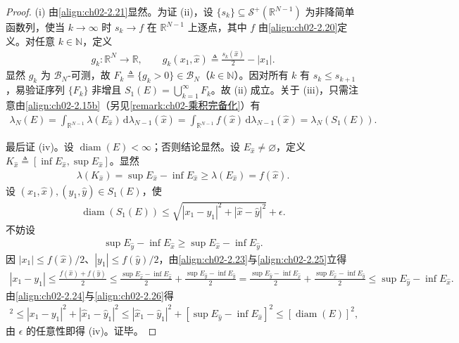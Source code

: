 \documentclass[../../main.tex]{subfiles}%
\begin{document}
\begin{proof}
(i) 由\eqref{align:ch02-2.21}显然。为证 (ii)，设 $\{s_k\}\subseteq\mathscr S^+(\mathbb R^{N-1})$ 为非降简单函数列，使当 $k\to\infty$ 时 $s_k\to f$ 在 $\mathbb R^{N-1}$ 上逐点，其中 $f$ 由\eqref{align:ch02-2.20}定义。对任意 $k\in\mathbb N$，定义
\begin{align*}
g_k:\mathbb R^N\to\mathbb R,\qquad g_k(x_1,\hat x)\triangleq \frac{s_k(\hat x)}2-|x_1|.
\end{align*}
显然 $g_k$ 为 $\mathscr B_N$-可测，故 $F_k\triangleq \{g_k>0\}\in\mathscr B_N$（$k\in\mathbb N$）。因对所有 $k$ 有 $s_k\leqslant s_{k+1}$，易验证序列 $\{F_k\}$ 非增且 $S_1(E)=\bigcup_{k=1}^\infty F_k$。故 (ii) 成立。关于 (iii)，只需注意由\eqref{align:ch02-2.15b}（另见\cref{remark:ch02-乘积完备化}）有
\begin{align*}
\lambda_N(E)=\int_{\mathbb R^{N-1}}\lambda(E_{\hat x})\,\mathrm{d}\lambda_{N-1}(\hat x)
=\int_{\mathbb R^{N-1}}f(\hat x)\,\mathrm{d}\lambda_{N-1}(\hat x)=\lambda_N(S_1(E)).
\end{align*}

最后证 (iv)。设 $\operatorname{diam}(E)<\infty$；否则结论显然。设 $E_{\hat x}\neq\varnothing $，定义 $K_{\hat x}\triangleq [\inf E_{\hat x},\sup E_{\hat x}]$。显然
\begin{align}
\lambda(K_{\hat x})=\sup E_{\hat x}-\inf E_{\hat x}\geqslant\lambda(E_{\hat x})=f(\hat x). \label{align:ch02-2.23}
\end{align}
设 $(x_1,\hat x),(y_1,\hat y)\in S_1(E)$，使
\begin{align}
\operatorname{diam}(S_1(E))\leqslant\sqrt{|x_1-y_1|^2+|\hat x-\hat y|^2}+\epsilon. \label{align:ch02-2.24}
\end{align}
不妨设
\begin{align}
\sup E_{\hat y}-\inf E_{\hat x}\geqslant\sup E_{\hat x}-\inf E_{\hat y}. \label{align:ch02-2.25}
\end{align}
因 $|x_1|\leqslant f(\hat x)/2$、$|y_1|\leqslant f(\hat y)/2$，由\eqref{align:ch02-2.23}与\eqref{align:ch02-2.25}立得
\begin{align}
|x_1-y_1|\leqslant\frac{f(\hat x)+f(\hat y)}2
\leqslant\frac{\sup E_{\hat x}-\inf E_{\hat x}}2+\frac{\sup E_{\hat y}-\inf E_{\hat y}}2
=\frac{\sup E_{\hat y}-\inf E_{\hat x}}2+\frac{\sup E_{\hat x}-\inf E_{\hat y}}2
\leqslant\sup E_{\hat y}-\inf E_{\hat x}. \label{align:ch02-2.26}
\end{align}
由\eqref{align:ch02-2.24}与\eqref{align:ch02-2.26}得
\begin{align*}
[\operatorname{diam}(S_1(E))-\epsilon]^2\leqslant|x_1-y_1|^2+|\hat x_1-\hat y_1|^2
\leqslant|\hat x_1-\hat y_1|^2+[\sup E_{\hat y}-\inf E_{\hat x}]^2\leqslant[\operatorname{diam}(E)]^2,
\end{align*}
由 $\epsilon$ 的任意性即得 (iv)。证毕。
\end{proof}
\end{document}
